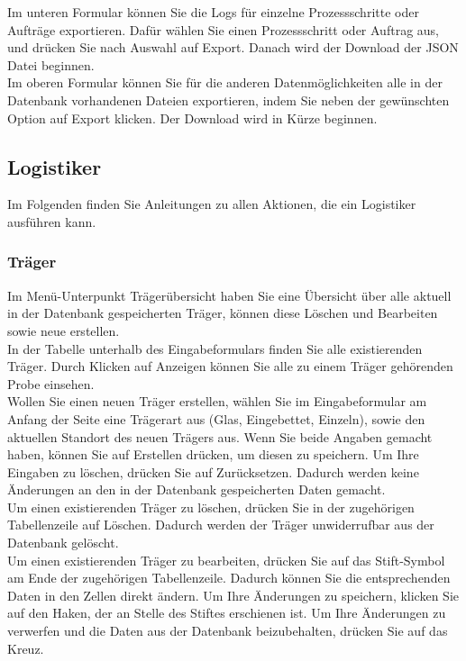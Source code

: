 \documentclass[enabledeprecatedfontcommands,fontsize=12pt,paper=a4,twoside]{scrartcl}
\begin{document}
Im unteren Formular können Sie die Logs für einzelne Prozessschritte oder Aufträge exportieren. Dafür wählen Sie einen Prozessschritt oder Auftrag aus, und drücken Sie nach Auswahl auf Export. Danach wird der Download der JSON Datei beginnen. \\

Im oberen Formular können Sie für die anderen Datenmöglichkeiten alle in der Datenbank vorhandenen Dateien exportieren, indem Sie neben der gewünschten Option auf Export klicken. Der Download wird in Kürze beginnen. \\
\subsection{Logistiker}

Im Folgenden finden Sie Anleitungen zu allen Aktionen, die ein Logistiker ausführen kann. \\

\subsubsection{Träger}
Im Menü-Unterpunkt Trägerübersicht haben Sie eine Übersicht über alle aktuell in der Datenbank gespeicherten Träger, können diese Löschen und Bearbeiten sowie neue erstellen. \\

In der Tabelle unterhalb des Eingabeformulars finden Sie alle existierenden Träger. Durch Klicken auf Anzeigen können Sie alle zu einem Träger gehörenden Probe einsehen. \\

Wollen Sie einen neuen Träger erstellen, wählen Sie im Eingabeformular am Anfang der Seite eine Trägerart aus (Glas, Eingebettet, Einzeln), sowie den aktuellen Standort des neuen Trägers aus. Wenn Sie beide Angaben gemacht haben, können Sie auf Erstellen drücken, um diesen zu speichern. Um Ihre Eingaben zu löschen, drücken Sie auf Zurücksetzen. Dadurch werden keine Änderungen an den in der Datenbank gespeicherten Daten gemacht. \\

Um einen existierenden Träger zu löschen, drücken Sie in der zugehörigen Tabellenzeile auf Löschen. Dadurch werden der Träger unwiderrufbar aus der Datenbank gelöscht. \\

Um einen existierenden Träger zu bearbeiten, drücken Sie auf das Stift-Symbol am Ende der zugehörigen Tabellenzeile. Dadurch können Sie die entsprechenden Daten in den Zellen direkt ändern. Um Ihre Änderungen zu speichern, klicken Sie auf den Haken, der an Stelle des Stiftes erschienen ist. Um Ihre Änderungen zu verwerfen und die Daten aus der Datenbank beizubehalten, drücken Sie auf das Kreuz. \\
\end{document}
